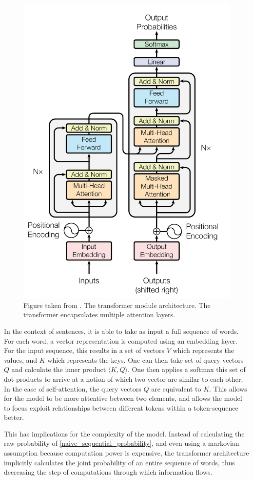 \documentclass[a4paper,12pt,twoside,openright]{report}
\begin{document}
\begin{figure}[H]
	\center
  \includegraphics[width=0.5\linewidth]{./assets/background/transformer_module.png}
  \caption{Figure taken from \cite{vaswani17}. The transformer module architecture. The transformer encapsulates multiple attention layers.}
  \label{fig:attention_is_all_you_need}
\end{figure}

In the context of sentences, it is able to take as input a full sequence of words.
For each word, a vector representation is computed using an embedding layer.
For the input sequence, this results in a set of vectors $V$ which represents the values, and $K$ which represents the keys.
One can then take set of query vectors $Q$ and calculate the inner product $\langle K, Q \rangle$.
One then applies a softmax this set of dot-products to arrive at a notion of which two vector are similar to each other.
In the case of self-attention, the query vectors $Q$ are equivalent to $K$.
This allows for the model to be more attentive between two elements, and allows the model to focus exploit relationships between different tokens within a token-sequence better.


This has implications for the complexity of the model.
Instead of calculating the raw probability of \eqref{naive_sequential_probability}, and even using a markovian assumption because computation power is expensive, the transformer architecture implicitly calculates the joint probability of an entire sequence of words, thus decreasing the step of computations through which information flows. \\
\end{document}
